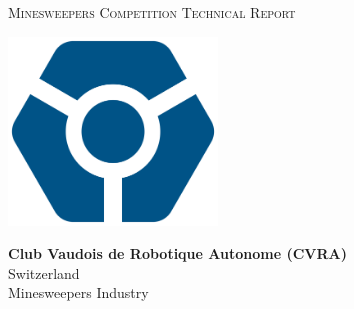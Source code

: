 \begin{titlepage}
\begin{center}

\vspace{1cm}

\Huge{\textsc{Minesweepers Competition Technical Report}}


\vfill{}
\includegraphics[height=5cm]{emblem}
\vspace{2cm}

\large{\bf{Club Vaudois de Robotique Autonome (CVRA)}}\\
Switzerland\\
Minesweepers Industry

\vspace{2cm}

\begin{abstract}
    
\end{abstract}

\end{center}
\end{titlepage}
